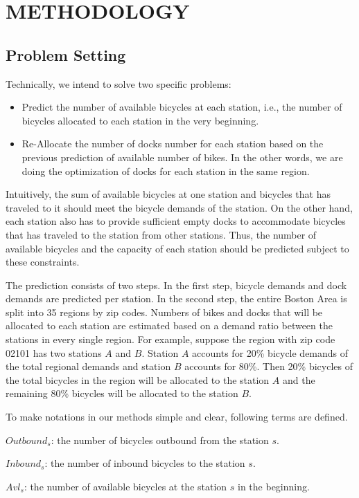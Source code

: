 \documentclass[journal, letterpaper]{IEEEtran}
\begin{document}
\section{METHODOLOGY}
\large
\subsection{Problem Setting}
Technically, we intend to solve two specific problems:
\begin{itemize}

\item Predict the number of available bicycles at each station, i.e., the number of bicycles allocated to each station in the very beginning. 
\item Re-Allocate the number of docks number for each station based on the previous prediction of available number of bikes. In the other words, we are doing the optimization of docks for each station in the same region. 
\end{itemize} 
Intuitively, the sum of available bicycles at one station and bicycles that has traveled to it should meet the bicycle demands of the station. On the other hand, each station also has to provide sufficient empty docks to accommodate bicycles that has traveled to the station from other stations. Thus, the number of available bicycles and the capacity of each station should be predicted subject to these constraints. 

The prediction consists of two steps. In the first step, bicycle demands and dock demands are predicted per station. In the second step, the entire Boston Area is split into 35 regions by zip codes. Numbers of bikes and docks that will be allocated to each station are estimated based on a demand ratio between the stations in every single region. For example, suppose the region with zip code 02101 has two stations $A$ and $B$. Station $A$ accounts for 20\% bicycle demands of the total regional demands and station $B$ accounts for 80\%. Then 20\% bicycles of the total bicycles in the region will be allocated to the station $A$ and the remaining 80\% bicycles will be allocated to the station $B$.     

To make notations in our methods simple and clear, following terms are defined. 

$Outbound_{s}$: the number of bicycles outbound from the station $s$.

$Inbound_{s}$: the number of inbound bicycles to the station $s$. 

$Avl_{s}$: the number of available bicycles at the station $s$ in the beginning. 
\end{document}
